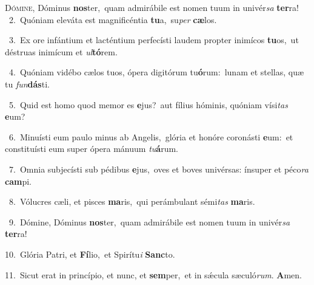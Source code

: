 \lettrine{\initial\textcolor{\initialcolor}{D}}{ómine,} Dóminus \textbf{nos}\-ter,~\star quam admirábile est nomen tuum in univér\textit{sa} \textbf{ter}\-ra!\\
{\numbfont\textcolor{\numbcolor}{~2.}}~Quóniam eleváta est magnificéntia \textbf{tu}\-a,~\star su\textit{per} \textbf{cæ}\-los.\par
{\numbfont\textcolor{\numbcolor}{~3.}}~Ex ore infántium et lacténtium perfecísti laudem propter inimícos \textbf{tu}\-os,~\star ut déstruas inimícum et \textit{ul}\-\textbf{tó}rem.\par
{\numbfont\textcolor{\numbcolor}{~4.}}~Quóniam vidébo cælos tuos, ópera digitórum tu\-\textbf{ó}\-rum:~\star lunam et stellas, quæ tu \textit{fun}\-\textbf{dás}ti.\par
{\numbfont\textcolor{\numbcolor}{~5.}}~Quid est homo quod memor es \textbf{e}\-jus?~\star aut fílius hóminis, quóniam vísi\textit{tas} \textbf{e}\-um?\par
{\numbfont\textcolor{\numbcolor}{~6.}}~Minuísti eum paulo minus ab Angelis,~\dagger glória et honóre coronásti \textbf{e}\-um:~\star et constituísti eum super ópera mánuum \textit{tu}\-\textbf{á}rum.\par
{\numbfont\textcolor{\numbcolor}{~7.}}~Omnia subjecísti sub pédibus \textbf{e}\-jus,~\star oves et boves univérsas: ínsuper et péco\textit{ra} \textbf{cam}\-pi.\par
{\numbfont\textcolor{\numbcolor}{~8.}}~Vólucres cæli, et pisces \textbf{ma}\-ris,~\star qui perámbulant sémi\textit{tas} \textbf{ma}\-ris.\par
{\numbfont\textcolor{\numbcolor}{~9.}}~Dómine, Dóminus \textbf{nos}\-ter,~\star quam admirábile est nomen tuum in univér\textit{sa} \textbf{ter}\-ra!\par
{\numbfont\textcolor{\numbcolor}{10.}}~Glória Patri, et \textbf{Fí}\-lio,~\star et Spirítu\textit{i} \textbf{Sanc}\-to.\par
{\numbfont\textcolor{\numbcolor}{11.}}~Sicut erat in princípio, et nunc, et \textbf{sem}\-per,~\star et in sǽcula sæculó\-\textit{rum}\-. \textbf{A}\-men.\par
